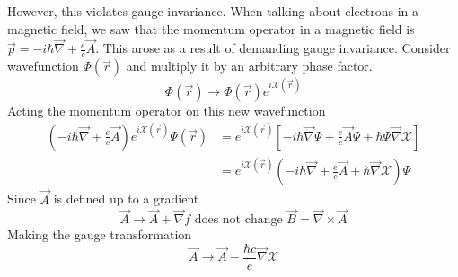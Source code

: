 \documentclass[12pt,a4paper,titlepage]{article}
\newcommand{\trm}[1]{\textrm{#1}} %
\newcommand{\Chi}{\mathcal{X}} %
\begin{document}
However, this violates gauge invariance. When talking about electrons in a magnetic field, we saw that the momentum operator in a magnetic field is $\vec{p}=-i\hbar\vec{\nabla}+\frac{e}{c}\vec{A}$. This arose as a result of demanding gauge invariance. Consider wavefunction $\Phi(\vec{r})$ and multiply it by an arbitrary phase factor.
\begin{equation}
\Phi(\vec{r})\rightarrow\Phi(\vec{r})e^{i\Chi(\vec{r})}
\end{equation}
Acting the momentum operator on this new wavefunction
\begin{equation}
\begin{aligned}
\left(-i\hbar\vec{\nabla}+\frac{e}{c}\vec{A}\right)e^{i\Chi(\vec{r})}\Psi(\vec{r})&=e^{i\Chi(\vec{r})}\left[-i\hbar\vec{\nabla}\Psi+\frac{e}{c}\vec{A}\Psi+\hbar\Psi\vec{\nabla}\Chi\right]\\
&=e^{i\Chi(\vec{r})}\left(-i\hbar\vec{\nabla}+\frac{e}{c}\vec{A}+\hbar\vec{\nabla}\Chi\right)\Psi
\end{aligned}
\end{equation}
Since $\vec{A}$ is defined up to a gradient
\begin{equation}
\vec{A}\rightarrow\vec{A}+\vec{\nabla}f\trm{ does not change }\vec{B}=\vec{\nabla}\times{\vec{A}}
\end{equation}
Making the gauge transformation
\begin{equation}
\vec{A}\rightarrow\vec{A}-\frac{\hbar c}{e}\vec{\nabla}\Chi
\end{equation}
\end{document}

